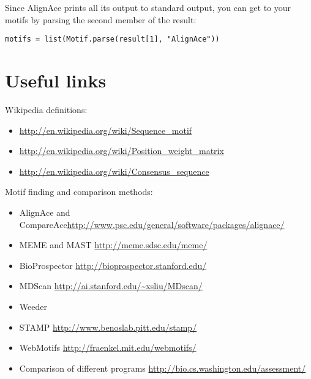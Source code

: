 \documentclass{article}
\begin{document}
Since AlignAce prints all its output to standard output, you can get
to your motifs by parsing the second member of the result:
\begin{verbatim}
motifs = list(Motif.parse(result[1], "AlignAce"))
\end{verbatim}



\section{Useful links }
\label{sec:links}

Wikipedia definitions:

\begin{itemize}
\item \url{http://en.wikipedia.org/wiki/Sequence_motif}
\item \url{http://en.wikipedia.org/wiki/Position_weight_matrix}
\item \url{http://en.wikipedia.org/wiki/Consensus_sequence}
\end{itemize}


Motif finding and comparison methods:

\begin{itemize}
\item AlignAce and CompareAce\url{http://www.psc.edu/general/software/packages/alignace/}
\item MEME and MAST \url{http://meme.sdsc.edu/meme/}
\item BioProspector \url{http://bioprospector.stanford.edu/}
\item MDScan \url{http://ai.stanford.edu/~xsliu/MDscan/}
\item Weeder
\item STAMP \url{http://www.benoslab.pitt.edu/stamp/}
\item WebMotifs \url{http://fraenkel.mit.edu/webmotifs/}
\item Comparison of different programs \url{http://bio.cs.washington.edu/assessment/}
\end{itemize}
\end{document}
